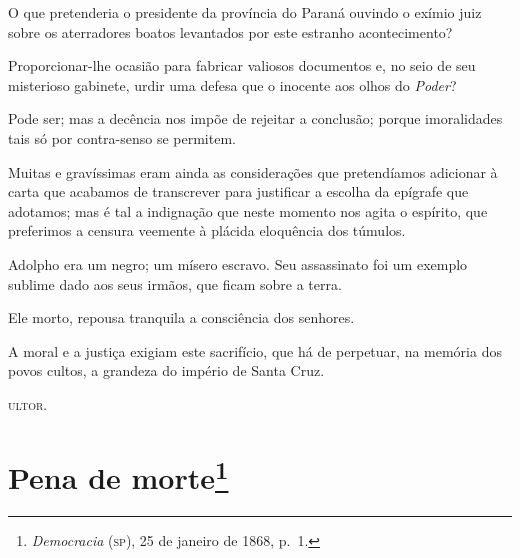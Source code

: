 O que pretenderia o presidente da província do Paraná ouvindo o exímio
juiz sobre os aterradores boatos levantados por este estranho
acontecimento?

Proporcionar-lhe ocasião para fabricar valiosos documentos e, no seio de
seu misterioso gabinete, urdir uma defesa que o inocente aos olhos do
\emph{Poder}?

Pode ser; mas a decência nos impõe de rejeitar a conclusão; porque
imoralidades tais só por contra-senso se permitem.

Muitas e gravíssimas eram ainda as considerações que pretendíamos
adicionar à carta que acabamos de transcrever para justificar a escolha
da epígrafe que adotamos; mas é tal a indignação que neste momento nos
agita o espírito, que preferimos a censura veemente à plácida eloquência
dos túmulos.

Adolpho era um negro; um mísero escravo. Seu assassinato foi um exemplo
sublime dado aos seus irmãos, que ficam sobre a terra.

Ele morto, repousa tranquila a consciência dos senhores.

A moral e a justiça exigiam este sacrifício, que há de perpetuar, na
memória dos povos cultos, a grandeza do império de Santa Cruz.

\textsc{ultor}.

\chapter{Pena de morte\footnote{\emph{Democracia} (\textsc{sp}), 25 de janeiro de 1868, p.~1.}}

